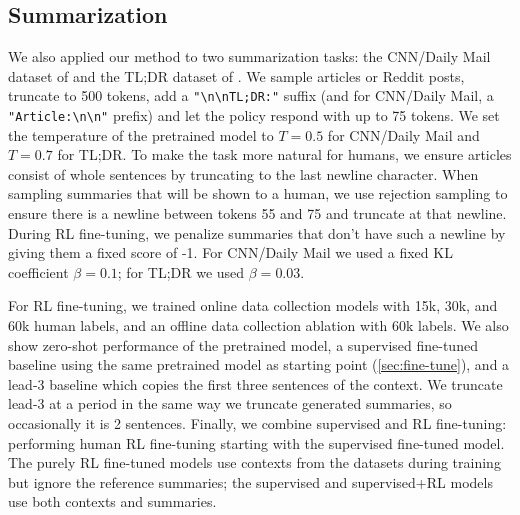 \documentclass{article}
\begin{document}
\subsection{Summarization \label{sec:summarization}}

We also applied our method to two summarization tasks: the CNN/Daily Mail dataset of \citet{hermann2015teaching} and the TL;DR dataset of \citet{volske2017tldr}. We sample articles or Reddit posts, truncate to 500 tokens, add a \verb+"\n\nTL;DR:"+ suffix (and for CNN/Daily Mail, a \verb+"Article:\n\n"+ prefix) and let the policy respond with up to 75 tokens.  We set the temperature of the pretrained model to $T = 0.5$ for CNN/Daily Mail and $T = 0.7$ for TL;DR.  To make the task more natural for humans, we ensure articles consist of whole sentences by truncating to the last newline character.
When sampling summaries that will be shown to a human, we use rejection sampling to ensure
there is a newline between tokens 55 and 75 and truncate at that newline.
During RL fine-tuning, we penalize summaries that don't have such a newline
by giving them a fixed score of -1.
For CNN/Daily Mail we used a fixed KL coefficient $\beta = 0.1$; for TL;DR we used $\beta = 0.03$.

For RL fine-tuning, we trained online data collection models with 15k, 30k, and 60k human labels, and an offline data collection ablation with 60k labels.  We also show zero-shot performance of the pretrained model, a supervised fine-tuned baseline using the same pretrained model as starting point (\cref{sec:fine-tune}), and a lead-3 baseline which copies the first three sentences of the context.  We truncate lead-3 at a period in the same way we truncate generated summaries, so occasionally it is 2 sentences.  Finally, we combine supervised and RL fine-tuning: performing human RL fine-tuning starting with the supervised fine-tuned model.  The purely RL fine-tuned models use contexts from the datasets during training but ignore the reference summaries; the supervised and supervised+RL models use both contexts and summaries.
\end{document}
